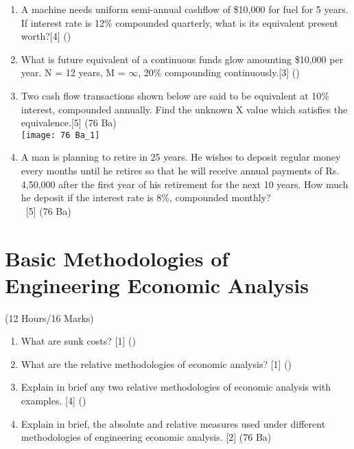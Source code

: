 \documentclass[12pt]{article}
\newcommand{\enter}{\\\textcolor{white}{1}}
\begin{document}
\begin{enumerate}
\item A machine needs uniform semi-annual cashflow of \$10,000 for fuel for 5 years. If interest rate is 12\% compounded quarterly, what is its equivalent present worth?\hfill[4] ()

\item What is future equivalent of a continuous funds glow amounting \$10,000 per year. N = 12 years, M = $\infty$, 20\% compounding continuously.\hfill[3] ()

\item Two cash flow transactions shown below are said to be equivalent at 10\% interest, compounded annually. Find the unknown X value which satisfies the equivalence.\hspace{6mm}[5] (76 Ba)\\
\texttt{[image: 76 Ba\_1]}

\item A man is planning to retire in 25 years. He wishes to deposit regular money every months until he retires so that he will receive annual payments of Rs. 4,50,000 after the first year of his retirement for the next 10 years. How much he deposit if the interest rate is 8\%, compounded monthly?
\enter\hfill[5] (76 Ba)
\end{enumerate}

\pagebreak
\section{Basic Methodologies of Engineering Economic Analysis}
\begin{center}(12 Hours/16 Marks)\end{center}
\begin{enumerate}[noitemsep, topsep = 0pt]
	\item What are sunk costs? \hfill [1] ()
	
	\item What are the relative methodologies of economic analysis? \hfill [1] ()
	
	\item Explain in brief any two relative methodologies of economic analysis with examples. \hfill [4] ()
	
	\item Explain in brief, the absolute and relative measures used under different methodologies of engineering economic analysis. \hspace{10.4cm} [2] (76 Ba)
	
\end{enumerate}
\end{document}
